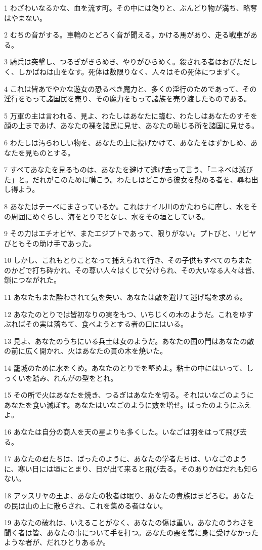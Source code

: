 \par 1 わざわいなるかな、血を流す町。その中には偽りと、ぶんどり物が満ち、略奪はやまない。
\par 2 むちの音がする。車輪のとどろく音が聞える。かける馬があり、走る戦車がある。
\par 3 騎兵は突撃し、つるぎがきらめき、やりがひらめく。殺される者はおびただしく、しかばねは山をなす。死体は数限りなく、人々はその死体につまずく。
\par 4 これは皆あでやかな遊女の恐るべき魔力と、多くの淫行のためであって、その淫行をもって諸国民を売り、その魔力をもって諸族を売り渡したものである。
\par 5 万軍の主は言われる、見よ、わたしはあなたに臨む、わたしはあなたのすそを顔の上まであげ、あなたの裸を諸民に見せ、あなたの恥じる所を諸国に見せる。
\par 6 わたしは汚らわしい物を、あなたの上に投げかけて、あなたをはずかしめ、あなたを見ものとする。
\par 7 すべてあなたを見るものは、あなたを避けて逃げ去って言う、「ニネベは滅びた」と。だれがこのために嘆こう。わたしはどこから彼女を慰める者を、尋ね出し得よう。
\par 8 あなたはテーベにまさっているか。これはナイル川のかたわらに座し、水をその周囲にめぐらし、海をとりでとなし、水をその垣としている。
\par 9 その力はエチオピヤ、またエジプトであって、限りがない。プトびと、リビヤびともその助け手であった。
\par 10 しかし、これもとりことなって捕えられて行き、その子供もすべてのちまたのかどで打ち砕かれ、その尊い人々はくじで分けられ、その大いなる人々は皆、鎖につながれた。
\par 11 あなたもまた酔わされて気を失い、あなたは敵を避けて逃げ場を求める。
\par 12 あなたのとりでは皆初なりの実をもつ、いちじくの木のようだ。これをゆすぶればその実は落ちて、食べようとする者の口にはいる。
\par 13 見よ、あなたのうちにいる兵士は女のようだ。あなたの国の門はあなたの敵の前に広く開かれ、火はあなたの貫の木を焼いた。
\par 14 籠城のために水をくめ。あなたのとりでを堅めよ。粘土の中にはいって、しっくいを踏み、れんがの型をとれ。
\par 15 その所で火はあなたを焼き、つるぎはあなたを切る。それはいなごのようにあなたを食い滅ぼす。あなたはいなごのように数を増せ。ばったのようにふえよ。
\par 16 あなたは自分の商人を天の星よりも多くした。いなごは羽をはって飛び去る。
\par 17 あなたの君たちは、ばったのように、あなたの学者たちは、いなごのように、寒い日には垣にとまり、日が出て来ると飛び去る。そのありかはだれも知らない。
\par 18 アッスリヤの王よ、あなたの牧者は眠り、あなたの貴族はまどろむ。あなたの民は山の上に散らされ、これを集める者はない。
\par 19 あなたの破れは、いえることがなく、あなたの傷は重い。あなたのうわさを聞く者は皆、あなたの事について手を打つ。あなたの悪を常に身に受けなかったような者が、だれひとりあるか。


